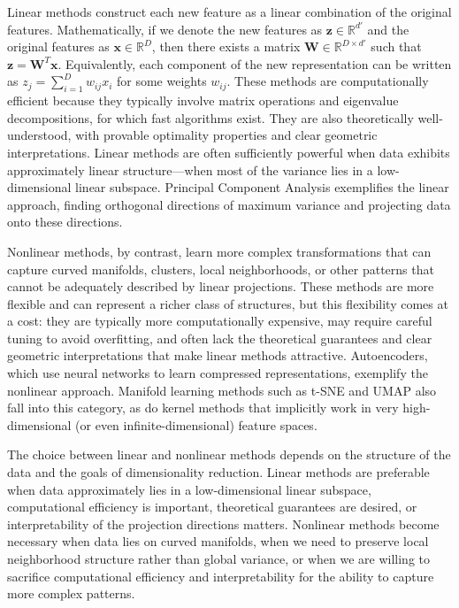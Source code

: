 Linear methods construct each new feature as a linear combination of the original features. Mathematically, if we denote the new features as $\mathbf{z} \in \mathbb{R}^{d'}$ and the original features as $\mathbf{x} \in \mathbb{R}^D$, then there exists a matrix $\mathbf{W} \in \mathbb{R}^{D \times d'}$ such that $\mathbf{z} = \mathbf{W}^T \mathbf{x}$. Equivalently, each component of the new representation can be written as $z_j = \sum_{i=1}^D w_{ij} x_i$ for some weights $w_{ij}$. These methods are computationally efficient because they typically involve matrix operations and eigenvalue decompositions, for which fast algorithms exist. They are also theoretically well-understood, with provable optimality properties and clear geometric interpretations. Linear methods are often sufficiently powerful when data exhibits approximately linear structure—when most of the variance lies in a low-dimensional linear subspace. Principal Component Analysis exemplifies the linear approach, finding orthogonal directions of maximum variance and projecting data onto these directions.

Nonlinear methods, by contrast, learn more complex transformations that can capture curved manifolds, clusters, local neighborhoods, or other patterns that cannot be adequately described by linear projections. These methods are more flexible and can represent a richer class of structures, but this flexibility comes at a cost: they are typically more computationally expensive, may require careful tuning to avoid overfitting, and often lack the theoretical guarantees and clear geometric interpretations that make linear methods attractive. Autoencoders, which use neural networks to learn compressed representations, exemplify the nonlinear approach. Manifold learning methods such as t-SNE and UMAP also fall into this category, as do kernel methods that implicitly work in very high-dimensional (or even infinite-dimensional) feature spaces.

The choice between linear and nonlinear methods depends on the structure of the data and the goals of dimensionality reduction. Linear methods are preferable when data approximately lies in a low-dimensional linear subspace, computational efficiency is important, theoretical guarantees are desired, or interpretability of the projection directions matters. Nonlinear methods become necessary when data lies on curved manifolds, when we need to preserve local neighborhood structure rather than global variance, or when we are willing to sacrifice computational efficiency and interpretability for the ability to capture more complex patterns.

